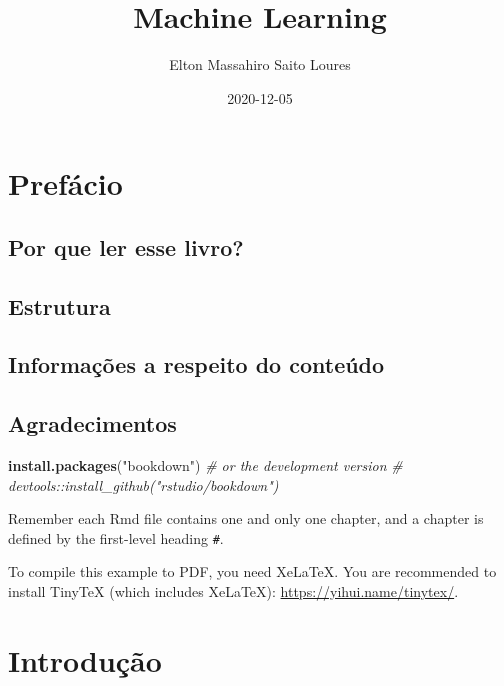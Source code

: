 \documentclass[
]{book}
\title{Machine Learning}
\author{Elton Massahiro Saito Loures}
\date{2020-12-05}
\newenvironment{Shaded}{\begin{snugshade}}{\end{snugshade}}
\newcommand{\CommentTok}[1]{\textcolor[rgb]{0.56,0.35,0.01}{\textit{#1}}}
\newcommand{\KeywordTok}[1]{\textcolor[rgb]{0.13,0.29,0.53}{\textbf{#1}}}
\newcommand{\NormalTok}[1]{#1}
\newcommand{\StringTok}[1]{\textcolor[rgb]{0.31,0.60,0.02}{#1}}
\begin{document}
\maketitle

{
\setcounter{tocdepth}{1}
\tableofcontents
}
\hypertarget{prefuxe1cio}{%
\chapter*{Prefácio}\label{prefuxe1cio}}

\hypertarget{por-que-ler-esse-livro}{%
\section{Por que ler esse livro?}\label{por-que-ler-esse-livro}}

\hypertarget{estrutura}{%
\section{Estrutura}\label{estrutura}}

\hypertarget{informauxe7uxf5es-a-respeito-do-conteuxfado}{%
\section{Informações a respeito do conteúdo}\label{informauxe7uxf5es-a-respeito-do-conteuxfado}}

\hypertarget{agradecimentos}{%
\section{Agradecimentos}\label{agradecimentos}}

\begin{Shaded}
\begin{Highlighting}[]
\KeywordTok{install.packages}\NormalTok{(}\StringTok{"bookdown"}\NormalTok{)}
\CommentTok{# or the development version}
\CommentTok{# devtools::install_github("rstudio/bookdown")}
\end{Highlighting}
\end{Shaded}

Remember each Rmd file contains one and only one chapter, and a chapter is defined by the first-level heading \texttt{\#}.

To compile this example to PDF, you need XeLaTeX. You are recommended to install TinyTeX (which includes XeLaTeX): \url{https://yihui.name/tinytex/}.

\hypertarget{intro}{%
\chapter{Introdução}\label{intro}}
\end{document}

